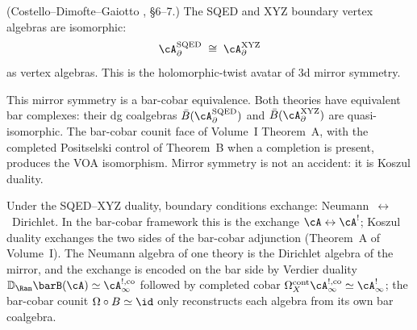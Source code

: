 \begin{theorem}
\label{thm:sqed-xyz-mirror}
\textup{(Costello--Dimofte--Gaiotto \cite{CDG2023}, \S6--7.)}
The SQED and XYZ boundary vertex algebras are isomorphic:
\[
 \cA_{\partial}^{\mathrm{SQED}}
 \;\cong\;
 \cA_{\partial}^{\mathrm{XYZ}}
\]
as vertex algebras. This is the holomorphic-twist avatar of $3$d
mirror symmetry.
\end{theorem}

\begin{remark}
\label{rem:mirror-as-koszul}
This mirror symmetry is a bar-cobar equivalence. Both theories
have equivalent bar complexes: their dg coalgebras
$\bar{B}(\cA_{\partial}^{\mathrm{SQED}})$ and
$\bar{B}(\cA_{\partial}^{\mathrm{XYZ}})$ are quasi-isomorphic. The
bar-cobar counit face of Volume~I Theorem~A, with the completed
Positselski control of Theorem~B when a completion is present, produces
the VOA isomorphism. Mirror symmetry is not an accident: it is Koszul
duality.
\end{remark}

\begin{remark}
\label{rem:mirror-bc-exchange}
Under the SQED--XYZ duality, boundary conditions exchange:
Neumann~$\leftrightarrow$~Dirichlet. In the bar-cobar framework
this is the exchange $\cA \leftrightarrow \cA^!$; Koszul duality
exchanges the two sides of the bar-cobar adjunction
(Theorem~A of Volume~I). The Neumann algebra of one theory is the
Dirichlet algebra of the mirror, and the exchange is encoded on
the bar side by Verdier duality
$\mathbb{D}_{\Ran}\barB(\cA)\simeq \cA^{!,\mathrm{co}}_\infty$ followed
by completed cobar
$\Omega_X^{\mathrm{cont}}\cA^{!,\mathrm{co}}_\infty\simeq\cA^!_\infty$;
the
bar-cobar counit $\Omega \circ B \simeq \id$ only reconstructs
each algebra from its own bar coalgebra.
\end{remark}

